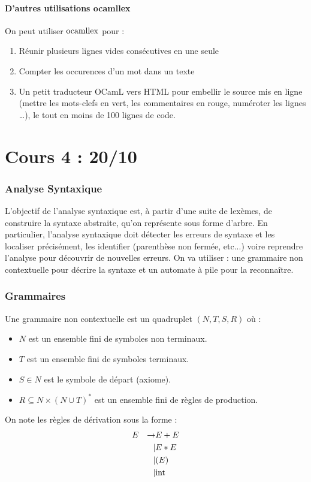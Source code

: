 \documentclass{cours}
\begin{document}
\subsection{D'autres utilisations \textmd{ocamllex}}
On peut utiliser $\textmd{ocamllex}$ pour :
\begin{enumerate}
    \item Réunir plusieurs lignes vides consécutives en une seule
    \item Compter les occurences d'un mot dans un texte
    \item Un petit traducteur OCamL vers HTML pour embellir le source mis en ligne (mettre les mots-clefs en vert, les commentaires en rouge, numéroter les lignes \dots), le tout en moins de 100 lignes de code.
\end{enumerate}


\part[Analyse Syntaxique]{Cours 4 : 20/10}
\section{Analyse Syntaxique}
L'objectif de l'analyse syntaxique est, à partir d'une suite de lexèmes, de construire la syntaxe abstraite, qu'on représente sous forme d'arbre. En particulier, l'analyse syntaxique doit détecter les erreurs de syntaxe et les localiser précisément, les identifier (parenthèse non fermée, etc...) voire reprendre l'analyse pour découvrir de nouvelles erreurs. On va utiliser : une grammaire non contextuelle pour décrire la syntaxe et un automate à pile pour la reconnaître. 

\section{Grammaires}
\begin{definition}
    Une grammaire non contextuelle est un quadruplet $(N, T, S, R)$ où :
    \begin{itemize}
        \item $N$ est un ensemble fini de symboles non terminaux.
        \item $T$ est un ensemble fini de symboles terminaux.
        \item $S \in N$ est le symbole de départ (axiome).
        \item $R \subseteq N \times (N \cup T)^{*}$ est un ensemble fini de règles de production.
    \end{itemize}
\end{definition}
On note les règles de dérivation sous la forme : 
\begin{equation*}
    \begin{aligned}
        &E &\rightarrow &E + E\\
        & &\mid &E*E\\
        & &\mid &(E)\\
        & &\mid &\textmd{int}
    \end{aligned}
\end{equation*}
\end{document}
